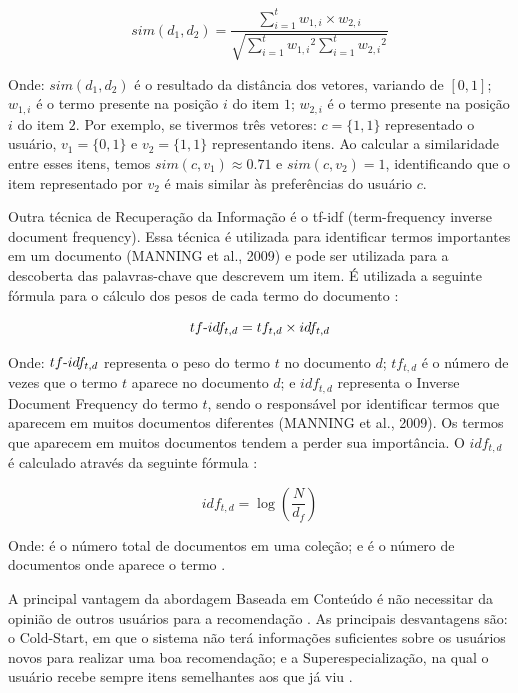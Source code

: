 \begin{equation}
  sim(d_1, d_2) = \frac{\sum_{i=1}^{t}{w_{1,i} \times w_{2,i}}}{\sqrt{\sum_{i=1}^{t}{w_{1,i}}^2 \sum_{i=1}^{t}{w_{2,i}}^2}}
  \label{eq:cosseno}
\end{equation}


Onde: $sim(d_1, d_2)$ é o resultado da distância dos vetores, variando de $[0,1]$; $w_{1,i}$ é o termo presente na
posição $i$ do item $1$; $w_{2,i}$ é o termo presente na posição $i$ do item $2$. Por exemplo, se tivermos três vetores: $c = \{1,1\}$
representado o usuário, $v_1 = \{0, 1\}$ e $v_2 = \{1, 1\}$ representando itens. Ao calcular a similaridade entre esses itens,
temos $sim(c, v_1) \approx 0.71$ e $sim(c, v_2) = 1$, identificando que o item representado por $v_2$ é mais similar às
preferências do usuário $c$.

Outra técnica de Recuperação da Informação é o tf-idf (term-frequency inverse document frequency). Essa técnica
é utilizada para identificar termos importantes em um documento (MANNING et al., 2009) e pode ser utilizada
para a descoberta das palavras-chave que descrevem um item. É utilizada a seguinte fórmula para o cálculo dos
pesos de cada termo do documento \cite{christopher2008introduction}:

\begin{equation}
  tf\hbox{-}idf_{t,d} = tf_{t,d} \times idf_{t,d}
  \label{eq:tf-idf}
\end{equation}

Onde: $tf\hbox{-}idf_{t,d}$ representa o peso do termo $t$ no documento $d$; $tf_{t,d}$ é o número de vezes que o termo
$t$ aparece no documento $d$; e $idf_{t,d}$ representa o Inverse Document Frequency do termo $t$, sendo o responsável por
identificar termos que aparecem em muitos documentos diferentes (MANNING et al., 2009). Os termos que aparecem em muitos
documentos tendem a perder sua importância. O $idf_{t,d}$ é calculado através da seguinte fórmula \cite{christopher2008introduction}:

\begin{equation}
  idf_{t,d} = \log(\frac{N}{d_f})
  \label{eq:idf}
\end{equation}

Onde:  é o número total de documentos em uma coleção; e  é o número de documentos onde aparece o termo .

A principal vantagem da abordagem Baseada em Conteúdo é não necessitar da opinião de outros usuários para a recomendação
\cite{ricci2011introduction}. As principais desvantagens são: o Cold-Start, em que o sistema não terá informações
suficientes sobre os usuários novos para realizar uma boa recomendação; e a Superespecialização, na qual o
usuário recebe sempre itens semelhantes aos que já viu \cite{lops2011content}.

